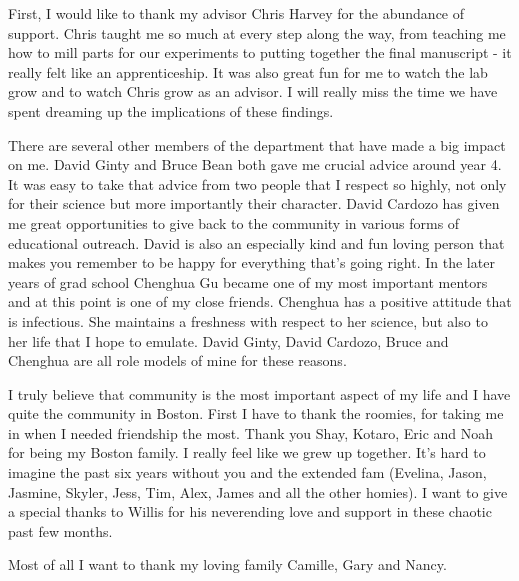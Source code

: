 
First, I would like to thank my advisor Chris Harvey for the abundance of support. Chris taught me so much at every step along the way, from teaching me how to mill parts for our experiments to putting together the final manuscript - it really felt like an apprenticeship. It was also great fun for me to watch the lab grow and to watch Chris grow as an advisor. I will really miss the time we have spent dreaming up the implications of these findings.

\bigskip

There are several other members of the department that have made a big impact on me. David Ginty and Bruce Bean both gave me crucial advice around year 4. It was easy to take that advice from two people that I respect so highly, not only for their science but more importantly their character. David Cardozo has given me great opportunities to give back to the community in various forms of educational outreach. David is also an especially kind and fun loving person that makes you remember to be happy for everything that's going right. In the later years of grad school Chenghua Gu became one of my most important mentors and at this point is one of my close friends. Chenghua has a positive attitude that is infectious. She maintains a freshness with respect to her science, but also to her life that I hope to emulate. David Ginty, David Cardozo, Bruce and Chenghua are all role models of mine for these reasons.

\bigskip

I truly believe that community is the most important aspect of my life and I have quite the community in Boston. First I have to thank the roomies, for taking me in when I needed friendship the most. Thank you Shay, Kotaro, Eric and Noah for being my Boston family. I really feel like we grew up together. It's hard to imagine the past six years without you and the extended fam (Evelina, Jason, Jasmine, Skyler, Jess, Tim, Alex, James and all the other homies). I want to give a special thanks to Willis for his neverending love and support in these chaotic past few months.

\bigskip

Most of all I want to thank my loving family Camille, Gary and Nancy.